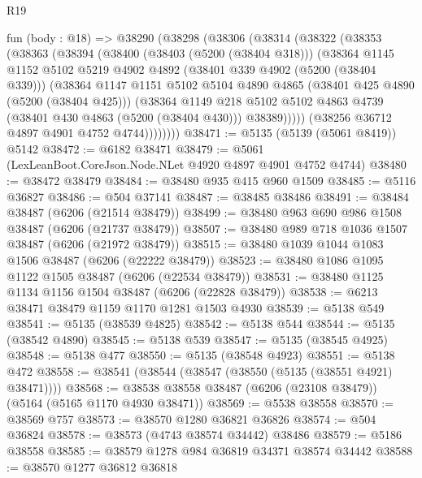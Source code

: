 \begin{lexlean}{R19}
\begin{coremodule}
{{{{{{{{{{{    fun (body : @18) =>
    @38290
      (@38298
        (@38306
          (@38314
            (@38322
              (@38353
                (@38363
                  (@38394
                    (@38400
                      (@38403 (@5200 (@38404 @318)))
                      (@38364
                        @1145
                        @1152
                        @5102
                        @5219
                        @4902
                        @4892
                        (@38401 @339 @4902 (@5200 (@38404 @339)))
                        (@38364
                          @1147
                          @1151
                          @5102
                          @5104
                          @4890
                          @4865
                          (@38401 @425 @4890 (@5200 (@38404 @425)))
                          (@38364
                            @1149
                            @218
                            @5102
                            @5102
                            @4863
                            @4739
                            (@38401 @430 @4863 (@5200 (@38404 @430)))
                            @38389)))))
                  (@38256 @36712 @4897 @4901 @4752 @4744))))))))
@38471 := @5135 (@5139 (@5061 @8419)) @5142
@38472 := @6182 @38471
@38479 := @5061 (LexLeanBoot.CoreJson.Node.NLet @4920 @4897 @4901 @4752 @4744)
@38480 := @38472 @38479
@38484 := @38480 @935 @415 @960 @1509
@38485 := @5116 @36827
@38486 := @504 @37141
@38487 := @38485 @38486
@38491 := @38484 @38487 (@6206 (@21514 @38479))
@38499 := @38480 @963 @690 @986 @1508 @38487 (@6206 (@21737 @38479))
@38507 := @38480 @989 @718 @1036 @1507 @38487 (@6206 (@21972 @38479))
@38515 := @38480 @1039 @1044 @1083 @1506 @38487 (@6206 (@22222 @38479))
@38523 := @38480 @1086 @1095 @1122 @1505 @38487 (@6206 (@22534 @38479))
@38531 := @38480 @1125 @1134 @1156 @1504 @38487 (@6206 (@22828 @38479))
@38538 := @6213 @38471 @38479 @1159 @1170 @1281 @1503 @4930
@38539 := @5138 @549
@38541 := @5135 (@38539 @4825)
@38542 := @5138 @544
@38544 := @5135 (@38542 @4890)
@38545 := @5138 @539
@38547 := @5135 (@38545 @4925)
@38548 := @5138 @477
@38550 := @5135 (@38548 @4923)
@38551 := @5138 @472
@38558 := @38541 (@38544 (@38547 (@38550 (@5135 (@38551 @4921) @38471))))
@38568 := @38538 @38558 @38487 (@6206 (@23108 @38479)) (@5164 (@5165 @1170 @4930 @38471))
@38569 := @5538 @38558
@38570 := @38569 @757
@38573 := @38570 @1280 @36821 @36826
@38574 := @504 @36824
@38578 := @38573 (@4743 @38574 @34442) @38486
@38579 := @5186 @38558
@38585 := @38579 @1278 @984 @36819 @34371 @38574 @34442
@38588 := @38570 @1277 @36812 @36818
}}}}}}}}}}}
\end{coremodule}
\end{lexlean}
